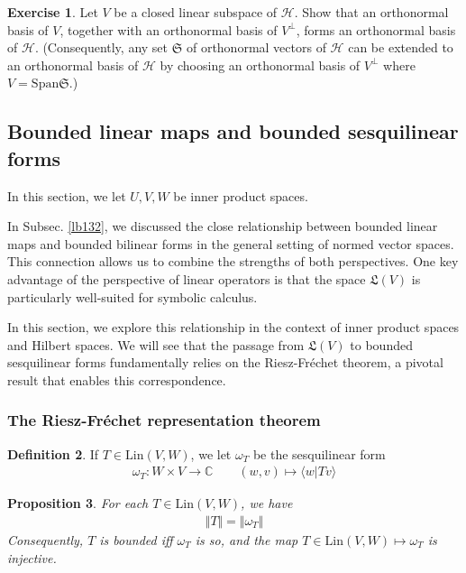 \documentclass[12pt,b5paper,notitlepage]{article}
\theoremstyle{definition}
\newtheorem{df}{Definition}[subsection]
\newtheorem{exe}[df]{Exercise}
\theoremstyle{plain}
\newtheorem{pp}[df]{Proposition}
\newcommand{\fk}{\mathfrak}
\newcommand{\Span}{\mathrm{Span}}
\newcommand{\bk}[1]{\langle {#1}\rangle}
\newcommand{\Cbb}{\mathbb C}
\newcommand{\Lin}{\mathrm{Lin}}
\newcommand{\MH}{\mathcal H}
\numberwithin{equation}{section}
\begin{document}
\begin{exe}\label{lb281}
Let $V$ be a closed linear subspace of $\MH$. Show that an orthonormal basis of $V$, together with an orthonormal basis of $V^\perp$, forms an orthonormal basis of $\MH$. (Consequently, any set $\fk S$ of orthonormal vectors of $\MH$ can be extended to an orthonormal basis of $\MH$ by choosing an orthonormal basis of $V^\perp$ where $V=\Span\fk S$.)
\end{exe}





\subsection{Bounded linear maps and bounded sesquilinear forms}



In this section, we let $U,V,W$ be inner product spaces.



In Subsec. \ref{lb132}, we discussed the close relationship between bounded linear maps and bounded bilinear forms in the general setting of normed vector spaces. This connection allows us to combine the strengths of both perspectives. One key advantage of the perspective of linear operators is that the space $\fk L(V)$ is particularly well-suited for symbolic calculus.


In this section, we explore this relationship in the context of inner product spaces and Hilbert spaces. We will see that the passage from $\fk L(V)$ to bounded sesquilinear forms fundamentally relies on the Riesz-Fr\'echet theorem, a pivotal result that enables this correspondence.


\subsubsection{The Riesz-Fr\'echet representation theorem}


\begin{df}
If $T\in\Lin(V,W)$, we let $\omega_T$ be the sesquilinear form 
\begin{gather*}
\omega_T:W\times V\rightarrow\Cbb \qquad (w,v)\mapsto \bk{w|Tv}
\end{gather*}
\end{df}

\begin{pp}\label{lb133}
For each $T\in\Lin(V,W)$, we have
\begin{align*}
\Vert T\Vert=\Vert\omega_T\Vert
\end{align*}
Consequently, $T$ is bounded iff $\omega_T$ is so, and the map $T\in\Lin(V,W)\mapsto \omega_T$ is injective.
\end{pp}
\end{document}

